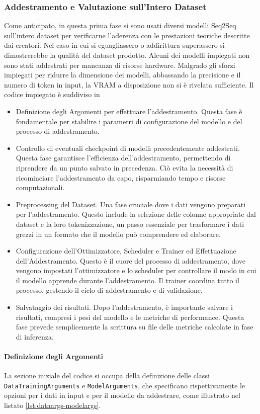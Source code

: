 \documentclass[12pt,a4paper,twoside,openright]{book}
\begin{document}
\subsubsection{Addestramento e Valutazione sull'Intero Dataset}
Come anticipato, in questa prima fase si sono usati diversi modelli Seq2Seq sull'intero dataset per verificarne l'aderenza con le prestazioni teoriche descritte dai creatori. Nel caso in cui si eguagliassero o addirittura superassero si dimostrerebbe la qualità del dataset prodotto. Alcuni dei modelli impiegati non sono stati addestrati per mancanza di risorse hardware. Malgrado gli sforzi impiegati per ridurre la dimensione dei modelli, abbassando la precisione e il numero di token in input, la VRAM a disposizione non si è rivelata sufficiente.
Il codice impiegato è suddiviso in 
\begin{itemize}
    \item Definizione degli Argomenti per effettuare l'addestramento. Questa fase è fondamentale per stabilire i parametri di configurazione del modello e del processo di addestramento.
    \item Controllo di eventuali checkpoint di modelli precedentemente addestrati. Questa fase garantisce l'efficienza dell'addestramento, permettendo di riprendere da un punto salvato in precedenza. Ciò evita la necessità di ricominciare l'addestramento da capo, risparmiando tempo e risorse computazionali.
    \item Preprocessing del Dataset. Una fase cruciale dove i dati vengono preparati per l'addestramento. Questo include la selezione delle colonne appropriate dal dataset e la loro tokenizzazione, un passo essenziale per trasformare i dati grezzi in un formato che il modello può comprendere ed elaborare.
    \item Configurazione dell'Ottimizzatore, Scheduler e Trainer ed Effettuazione dell'Addestramento. Questo è il cuore del processo di addestramento, dove vengono impostati l'ottimizzatore e lo scheduler per controllare il modo in cui il modello apprende durante l'addestramento. Il trainer coordina tutto il processo, gestendo il ciclo di addestramento e di validazione.
    \item Salvataggio dei risultati. Dopo l'addestramento, è importante salvare i risultati, compresi i pesi del modello e le metriche di performance. Questa fase prevede semplicemente la scrittura su file delle metriche calcolate in fase di inferenza. 
\end{itemize}

\paragraph{Definizione degli Argomenti}
La sezione iniziale del codice si occupa della definizione delle classi \texttt{DataTrainingArguments} e \texttt{ModelArguments}, che specificano rispettivamente le opzioni per i dati in input e per il modello da addestrare, come illustrato nel listato \ref{lst:dataargs-modelargs}.
\end{document}
